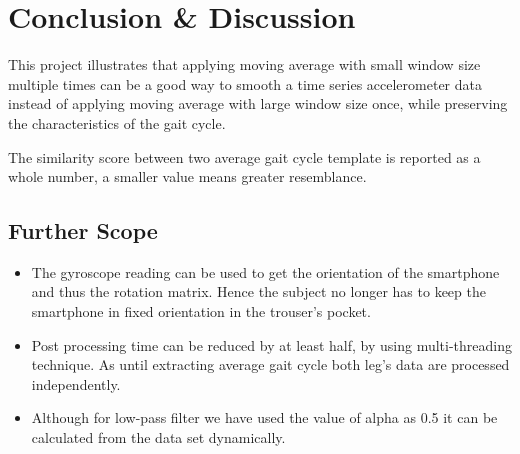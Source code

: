 \chapter{Conclusion \& Discussion}\label{final}


This project illustrates that applying moving average with small window size multiple times can be a good way to smooth a time series accelerometer data instead of applying moving average with large window size once, while preserving the characteristics of the gait cycle.

The similarity score between two average gait cycle template is reported as a whole number, a smaller value means greater resemblance.

\section*{Further Scope}
\begin{itemize}
\item The gyroscope reading can be used to get the orientation of the smartphone and thus the rotation matrix. Hence the subject no longer has to keep the smartphone in fixed orientation in the trouser’s pocket.
\item Post processing time can be reduced by at least half, by using multi-threading technique. As until extracting average gait cycle both leg’s data are processed independently.
\item Although for low-pass filter we have used the value of alpha as 0.5 it can be calculated from the data set dynamically.
\end{itemize}
